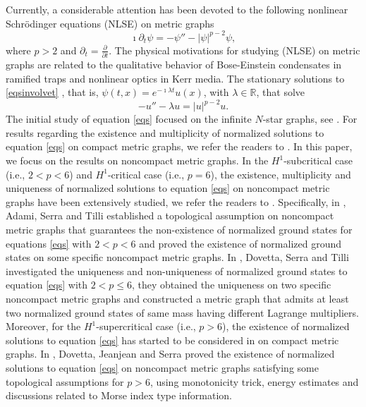 \documentclass[11pt]{amsart}
\newcommand{\abs}[1]{\lvert#1\rvert}
\numberwithin{equation}{section}
\begin{document}
Currently, a considerable attention has been devoted to the following nonlinear Schr\"odinger equations (NLSE) on metric graphs
\begin{equation}\label{eqsinvolvet}
     \imath\partial_t \psi = -\psi'' -\abs{\psi}^{p-2}\psi,
\end{equation}
where $p > 2$  and $\partial_t=\frac{\partial}{\partial t}$.
The physical motivations for studying (NLSE) on metric graphs
are related to the qualitative behavior of Bose-Einstein condensates in ramified traps and nonlinear optics in Kerr media. The stationary solutions to \eqref{eqsinvolvet} , that is, $\psi(t, x) = e^{-\imath \lambda t}u(x)$, with $\lambda \in \mathbb{R}$, that solve
\begin{equation}
\label{eqs}
    -u'' - \lambda u= \abs{u}^{p-2}u.
\end{equation}
The initial study of equation \eqref{eqs} focused on the infinite $N$-star graphs, see \cite{Ad1,Ad2}. For results regarding the existence and multiplicity of normalized solutions to equation \eqref{eqs} on compact metric graphs, we refer the readers to \cite{Jea,Do,Ch}. In this paper, we focus on the results on noncompact metric graphs. In the $H^1$-subcritical case (i.e., $2<p < 6$) and $H^1$-critical case (i.e., $p=6$), the existence, multiplicity and uniqueness of normalized solutions to equation \eqref{eqs} on noncompact metric graphs have been extensively studied, we refer the readers to \cite{Do0,Do1,Ad3,Ad4,Ad5,Ad6,Pi}. Specifically, in \cite{Ad3}, Adami, Serra and Tilli established a topological assumption on noncompact metric graphs that guarantees the non-existence of normalized ground states for equations \eqref{eqs} with $2<p<6$ and proved the existence of normalized ground states on some specific noncompact metric graphs. In \cite{Do1}, Dovetta, Serra and Tilli investigated the uniqueness and non-uniqueness of normalized ground states to equation \eqref{eqs} with $2<p\leq6$, they obtained the uniqueness on two specific noncompact metric graphs and constructed a metric graph that admits at least two normalized ground states of same mass having different Lagrange multipliers. Moreover, for the $H^1$-supercritical case (i.e., $p>6$), the existence of normalized solutions to equation \eqref{eqs} has started to be considered in \cite{Ch} on compact metric graphs. In \cite{Do0}, Dovetta, Jeanjean and Serra proved the existence of normalized solutions to equation \eqref{eqs} on noncompact metric graphs satisfying some topological assumptions for $p > 6$, using monotonicity trick, energy estimates and discussions related to Morse index type information.
\end{document}
